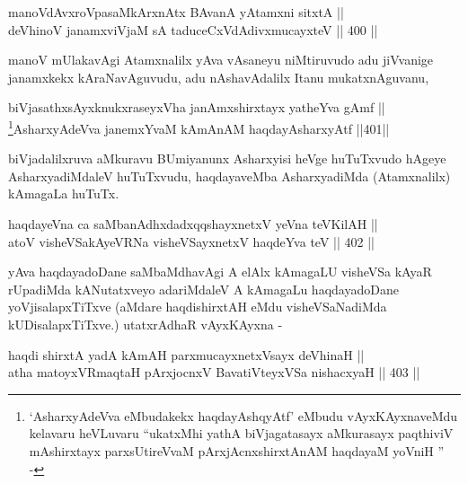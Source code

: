 \begin{shl}
manoVdAvxroVpasaMkArxnAtx BAvanA yA\s \s tamxni sitxtA || \\
deVhinoV janamxviVjaM sA taduceCxVdAdivxmucayxteV \hfill || 400 ||  
\end{shl}

\begin{artha}
manoV mUlakavAgi Atamxnalilx yAva vAsaneyu niMtiruvudo adu jiVvanige
janamxkekx kAraNavAguvudu, adu nAshavAdalilx Itanu mukatxnAguvanu,
\end{artha}


\begin{shl}
biVjasathxsAyxknukxraseyxVha janAmx\s \s shirxtayx yatheYva gAmf || \\
\footnote{`AsharxyAdeVva eMbudakekx haqdayAshqyAtf' eMbudu
vAyxKAyxnaveMdu kelavaru heVLuvaru ``ukatxMhi yathA biVjagatasayx aMkurasayx paqthiviV mAshirxtayx parxsUtireVvaM pArxjAcnxshirxtAnAM haqdayaM yoVniH '' -}AsharxyAdeVva janemxYvaM kAmAnAM haqdayAsharxyAtf \hfill ||401||  
\end{shl}


\begin{artha}
biVjadalilxruva aMkuravu BUmiyanunx Asharxyisi heVge
huTuTxvudo hAgeye AsharxyadiMdaleV huTuTxvudu, haqdayaveMba
AsharxyadiMda (Atamxnalilx) kAmagaLa huTuTx.
\end{artha}


\begin{shl}
haqdayeVna ca saMbanAdhxdadxqqshayxnetxV yeVna teV\s KilAH || \\
atoV visheVSakAyeVRNa visheVSayxnetxV haqdeYva teV \hfill || 402 ||  
\end{shl}

\begin{artha}
yAva haqdayadoDane saMbaMdhavAgi A elAlx kAmagaLU visheVSa kAyaR
rUpadiMda kANutatxveyo adariMdaleV A kAmagaLu haqdayadoDane
yoVjisalapxTiTxve (aMdare haqdishirxtAH eMdu visheVSaNadiMda kUDisalapxTiTxve.) utatxrAdhaR vAyxKAyxna -
\end{artha}

\begin{shl}
haqdi shirxtA yadA kAmAH parxmucayxnetxV\s sayx deVhinaH || \\
atha matoyxVR\s maqtaH pArxjocnxV BavatiVteyxVSa nishacxyaH \hfill || 403 ||  
\end{shl}

